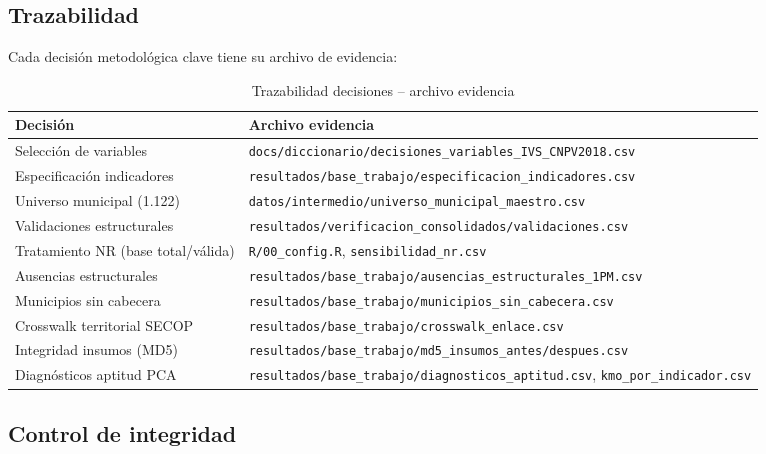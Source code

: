 \subsection{Trazabilidad}
\label{sec:trazabilidad}

Cada decisión metodológica clave tiene su archivo de evidencia:

\begin{table}[htbp]
\centering
\caption{Trazabilidad decisiones -- archivo evidencia}
\label{tab:trazabilidad}
\begin{adjustbox}{max width=\textwidth}
\begin{tabular}{@{}ll@{}}
\toprule
\textbf{Decisión} & \textbf{Archivo evidencia} \\
\midrule
Selección de variables & \texttt{docs/diccionario/decisiones\_variables\_IVS\_CNPV2018.csv} \\
Especificación indicadores & \texttt{resultados/base\_trabajo/especificacion\_indicadores.csv} \\
Universo municipal (1.122) & \texttt{datos/intermedio/universo\_municipal\_maestro.csv} \\
Validaciones estructurales & \texttt{resultados/verificacion\_consolidados/validaciones.csv} \\
Tratamiento NR (base total/válida) & \texttt{R/00\_config.R}, \texttt{sensibilidad\_nr.csv} \\
Ausencias estructurales & \texttt{resultados/base\_trabajo/ausencias\_estructurales\_1PM.csv} \\
Municipios sin cabecera & \texttt{resultados/base\_trabajo/municipios\_sin\_cabecera.csv} \\
Crosswalk territorial SECOP & \texttt{resultados/base\_trabajo/crosswalk\_enlace.csv} \\
Integridad insumos (MD5) & \texttt{resultados/base\_trabajo/md5\_insumos\_antes/despues.csv} \\
Diagnósticos aptitud PCA & \texttt{resultados/base\_trabajo/diagnosticos\_aptitud.csv}, \texttt{kmo\_por\_indicador.csv} \\
\bottomrule
\end{tabular}
\end{adjustbox}
\end{table}

\subsection{Control de integridad}
\label{sec:control_integridad}

